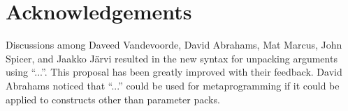 \documentclass{article}
\begin{document}
\section{Acknowledgements}
Discussions among Daveed Vandevoorde, David Abrahams, Mat Marcus, John
Spicer, and Jaakko J\"arvi resulted in the new syntax for unpacking
arguments using ``...''. This proposal has been greatly improved with
their feedback. David Abrahams noticed that ``...''  could be used for
metaprogramming if it could be applied to constructs other than
parameter packs.



\end{document}
